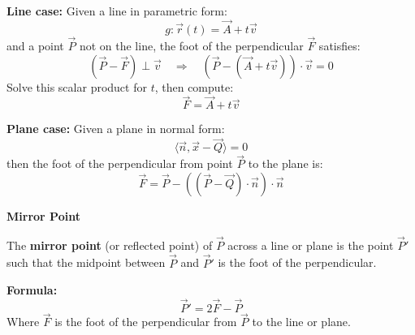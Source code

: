 \textbf{Line case:}
Given a line in parametric form:
\[
	g: \vec{r}(t) = \vec{A} + t\vec{v}
\]
and a point \(\vec{P}\) not on the line, the foot of the perpendicular \(\vec{F}\) satisfies:
\[
	(\vec{P} - \vec{F}) \perp \vec{v} \quad \Rightarrow \quad (\vec{P} - (\vec{A} + t\vec{v})) \cdot \vec{v} = 0
\]
Solve this scalar product for \(t\), then compute:
\[
	\vec{F} = \vec{A} + t\vec{v}
\]

\textbf{Plane case:}
Given a plane in normal form:
\[
	\langle \vec{n}, \vec{x} - \vec{Q} \rangle = 0
\]
then the foot of the perpendicular from point \(\vec{P}\) to the plane is:
\[
	\vec{F} = \vec{P} - ((\vec{P} - \vec{Q}) \cdot \vec{n}) \cdot \vec{n}
\]

\textbf{Mirror Point}

The \textbf{mirror point} (or reflected point) of \(\vec{P}\) across a line or plane is the point \(\vec{P}'\) such that the midpoint between \(\vec{P}\) and \(\vec{P}'\) is the foot of the perpendicular.

 \textbf{Formula:}
\[
	\vec{P}' = 2\vec{F} - \vec{P}
\]
Where \(\vec{F}\) is the foot of the perpendicular from \(\vec{P}\) to the line or plane.

\newpage
